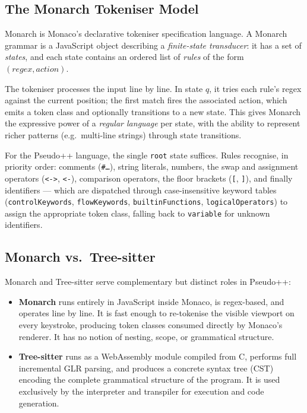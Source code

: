 \subsection{The Monarch Tokeniser Model}
\label{subsec:monarch}

Monarch \cite{monarch} is Monaco's declarative tokeniser specification language.
A Monarch grammar is a JavaScript object describing a \textit{finite-state transducer}:
it has a set of \textit{states}, and each state contains an ordered list of
\textit{rules} of the form $(\mathit{regex}, \mathit{action})$.

The tokeniser processes the input line by line.  In state $q$, it tries each rule's
regex against the current position; the first match fires the associated action, which
emits a token class and optionally transitions to a new state.  This gives Monarch the
expressive power of a \textit{regular language} per state, with the ability to
represent richer patterns (e.g.\ multi-line strings) through state transitions.

For the Pseudo++ language, the single \texttt{root} state suffices.  Rules recognise,
in priority order: comments (\texttt{\#\ldots}), string literals, numbers, the
swap and assignment operators (\texttt{<->}, \texttt{<-}), comparison operators, the
floor brackets (\texttt{[}, \texttt{]}), and finally identifiers --- which are
dispatched through case-insensitive keyword tables
(\texttt{controlKeywords}, \texttt{flowKeywords}, \texttt{builtinFunctions},
\texttt{logicalOperators}) to assign the appropriate token class, falling back to
\texttt{variable} for unknown identifiers.

\subsection{Monarch vs.\ Tree-sitter}

Monarch and Tree-sitter serve complementary but distinct roles in Pseudo++:

\begin{itemize}
  \item \textbf{Monarch} runs entirely in JavaScript inside Monaco, is
        regex-based, and operates line by line.  It is fast enough to re-tokenise
        the visible viewport on every keystroke, producing token classes consumed
        directly by Monaco's renderer.  It has no notion of nesting, scope, or
        grammatical structure.

  \item \textbf{Tree-sitter} runs as a WebAssembly module compiled from C, performs
        full incremental GLR parsing, and produces a concrete syntax tree (CST)
        encoding the complete grammatical structure of the program.  It is used
        exclusively by the interpreter and transpiler for execution and code
        generation.
\end{itemize}

